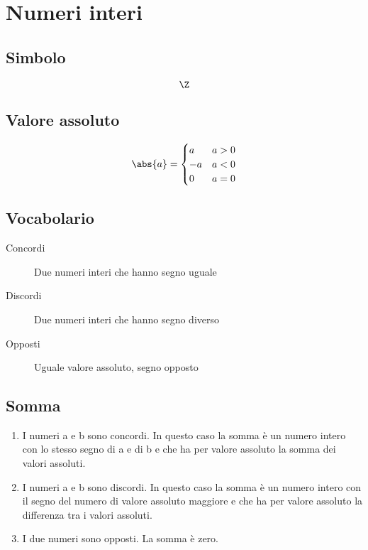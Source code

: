 \chapter{Numeri interi}
\section{Simbolo}
\begin{equation}
\Z
\end{equation}
\section{Valore assoluto}
\begin{equation}
\abs{a}=\begin{cases}
	a&a>0\\
	-a&a<0\\
	0&a=0
\end{cases}
\end{equation}
\section{Vocabolario}
\begin{description}
	\item[Concordi] Due numeri interi che hanno segno uguale
	\item[Discordi]  Due numeri interi che hanno segno diverso
	\item[Opposti] Uguale valore assoluto, segno opposto
\end{description}
\section{Somma}
\begin{enumerate}
	\item I numeri a e b sono concordi. In questo caso la somma è un numero intero con lo stesso segno di a e di b e che ha per valore assoluto la somma dei valori assoluti.
	\item I numeri a e b sono discordi. In questo caso la somma è un numero intero con il segno del numero di valore assoluto maggiore e che ha per valore assoluto la differenza tra i valori assoluti.
	\item I due numeri sono opposti. La somma è zero.
\end{enumerate}
